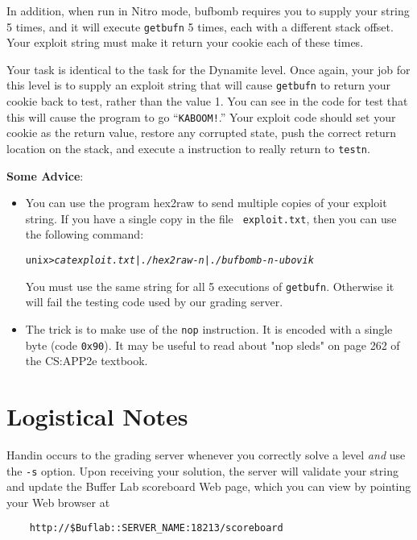 \documentclass[11pt]{article}
\newenvironment{tty}%
{\small\begin{alltt}}%
{\end{alltt}}
\begin{document}
In addition, when run in Nitro mode, {\sc bufbomb} requires you to
supply your string 5 times, and it will execute {\tt getbufn} 5 times,
each with a different stack offset.  Your exploit string must make it
return your cookie each of these times.

Your task is identical to the task for the Dynamite level. Once again,
your job for this level is to supply an exploit string that will cause
\texttt{getbufn} to return your cookie back to test, rather than the value 1.
You can see in the code for test that this will cause the program to go
``{\tt KABOOM!}.'' Your exploit code should set your cookie as the return
value, restore any corrupted state, push the correct return location on
the stack, and execute a \verb@ret@ instruction to really return to
{\tt testn}.

{\bf Some Advice}:
\begin{itemize}
\item You can use the program {\sc hex2raw} to send multiple copies
of your exploit string.  If you have a single copy in the file {\tt
exploit.txt}, then you can use the following command:

\begin{tty}
    unix>{\em cat exploit.txt | ./hex2raw -n | ./bufbomb -n -u bovik}
\end{tty}

You must use the same string for all 5 executions of {\tt getbufn}.
Otherwise it will fail the testing code used by our grading server.

\item
The trick is to make use of the {\tt nop} instruction.  It is encoded
with a single byte (code {\tt 0x90}). It may be useful to read about
"nop sleds" on page 262 of the CS:APP2e textbook.

\end{itemize}


\section*{Logistical Notes}

Handin occurs to the grading server whenever you correctly solve a
level {\em and} use the \texttt{-s} option.  Upon receiving your
solution, the server will validate your string and update the Buffer
Lab scoreboard Web page, which you can view by pointing your Web
browser at
\begin{verbatim}
    http://$Buflab::SERVER_NAME:18213/scoreboard
\end{verbatim}
\end{document}
